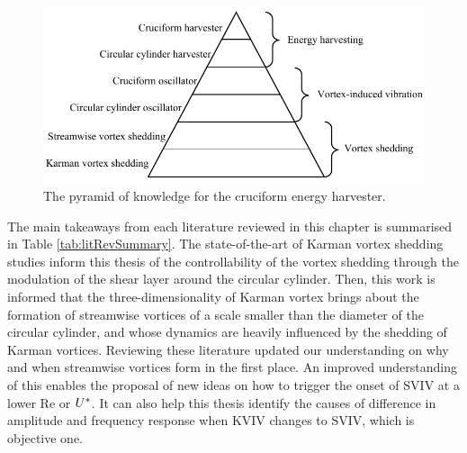 \documentclass[oneside]{utmthesis}
\begin{document}
\begin{figure}[!h]
  \centering
    \includegraphics[width=\textwidth]{figs/pyramidOfKnowledge}
    \caption{The pyramid of knowledge for the cruciform energy harvester.}
    \label{fig:pyramidOfKnowledge}
\end{figure}

The main takeaways from each literature reviewed in this chapter is summarised in Table \ref{tab:litRevSummary}. The state-of-the-art of Karman vortex shedding studies inform this thesis of the controllability of the vortex shedding through the modulation of the shear layer around the circular cylinder. Then, this work is informed that the three-dimensionality of Karman vortex brings about the formation of streamwise vortices of a scale smaller than the diameter of the circular cylinder, and whose dynamics are heavily influenced by the shedding of Karman vortices. Reviewing these literature updated our understanding on why and when streamwise vortices form in the first place. An improved understanding of this enables the proposal of new ideas on how to trigger the onset of SVIV at a lower Re or $U^{*}$. It can also help this thesis identify the causes of difference in amplitude and frequency response when KVIV changes to SVIV, which is objective one.
\end{document}
